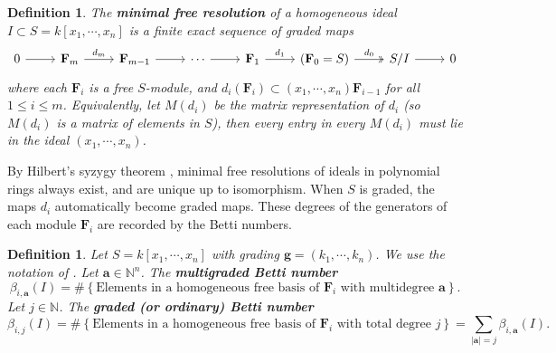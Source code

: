 \documentclass[dvipsnames,10pt]{article}
\newtheorem{defi}[theorem]{Definition}
\begin{document}
\begin{defi}
    The \textbf{minimal free resolution} of a homogeneous ideal $I\subset S=k[x_1,\cdots,x_n]$ is a finite exact sequence of graded maps
    \begin{equation*}
        \begin{tikzcd}
            0 \arrow[r, ""] & \mathbf{F}_m \arrow[r, "{d_m}"] & \mathbf{F}_{m-1} \arrow[r, ""] & \cdots \arrow[r, ""] & \mathbf{F}_1 \arrow[r, "{d_1}"] & (\mathbf{F}_0 = S) \arrow[r, "{d_0}", two heads] & S/I \arrow[r, ""] & 0
        \end{tikzcd}
    \end{equation*}
    where each $\mathbf{F}_i$ is a free $S$-module, and $d_i(\mathbf{F}_i)\subset (x_1,\cdots,x_n)\mathbf{F}_{i-1}$ for all $1\leqslant i\leqslant m$. Equivalently, let $M(d_i)$ be the matrix representation of $d_i$ (so $M(d_i)$ is a matrix of elements in $S$), then every entry in every $M(d_i)$ must lie in the ideal $(x_1,\cdots,x_n)$.
\end{defi}

By Hilbert's syzygy theorem \cite{hilbertsyzygy}, minimal free resolutions of ideals in polynomial rings always exist, and are unique up to isomorphism. When $S$ is graded, the maps $d_i$ automatically become graded maps. These degrees of the generators of each module $\mathbf{F}_i$ are recorded by the Betti numbers.

\begin{defi}
    Let $S=k[x_1,\cdots,x_n]$ with grading $\mathbf{g}=(k_1,\cdots,k_n)$. We use the notation of . Let $\mathbf{a}\in\mathbb{N}^n$. The \textbf{multigraded Betti number}
    \begin{equation*}
        \beta_{i,\mathbf{a}}(I) = \# \left\{ \text{Elements in a homogeneous free basis of $\mathbf{F}_i$ with multidegree $\mathbf{a}$} \right\}.
    \end{equation*}
    Let $j\in \mathbb{N}$. The \textbf{graded (or ordinary) Betti number}
    \begin{equation*}
        \beta_{i,j}(I) = \# \left\{ \text{Elements in a homogeneous free basis of $\mathbf{F}_i$ with total degree $j$} \right\} = \sum_{|\mathbf{a}|=j} \beta_{i,\mathbf{a}}(I).
    \end{equation*}
\end{defi}
\end{document}
